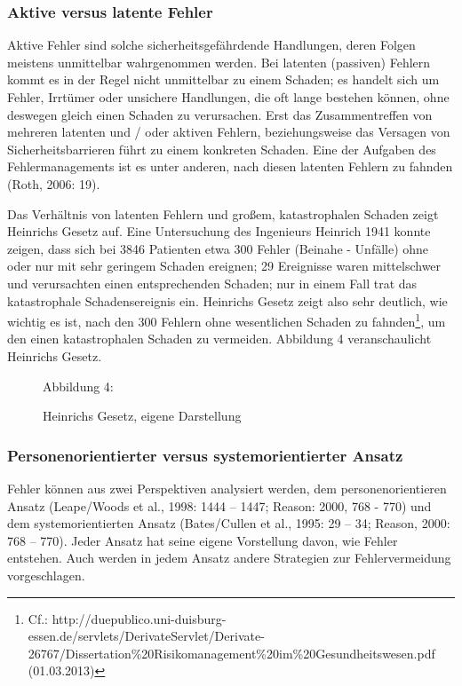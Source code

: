 \subsubsection{Aktive versus latente Fehler}

Aktive Fehler sind solche sicherheitsgefährdende Handlungen,
deren Folgen meistens unmittelbar wahrgenommen werden. Bei
latenten (passiven) Fehlern kommt es in der Regel nicht
unmittelbar zu einem Schaden; es handelt sich um Fehler,
Irrtümer oder unsichere Handlungen, die oft lange bestehen
können, ohne deswegen gleich einen Schaden zu verursachen.
Erst das Zusammentreffen von mehreren latenten und / oder
aktiven Fehlern, beziehungsweise das Versagen von
Sicherheitsbarrieren führt zu einem konkreten Schaden. Eine
der Aufgaben des Fehlermanagements ist es unter anderen,
nach diesen latenten Fehlern zu fahnden (Roth, 2006: 19).




Das Verhältnis von latenten Fehlern und großem,
katastrophalen Schaden zeigt Heinrichs Gesetz auf. Eine
Untersuchung des Ingenieurs Heinrich 1941 konnte zeigen,
dass sich bei 3846 Patienten etwa 300 Fehler (Beinahe -
Unfälle) ohne oder nur mit sehr geringem Schaden ereignen;
29 Ereignisse waren mittelschwer und verursachten einen
entsprechenden Schaden; nur in einem Fall trat das
katastrophale Schadensereignis ein. Heinrichs Gesetz zeigt
also sehr deutlich, wie wichtig es ist, nach den 300
Fehlern ohne wesentlichen Schaden zu fahnden\footnote{ Cf.:
http://duepublico.uni-duisburg-essen.de/servlets/DerivateServlet/Derivate-26767/Dissertation\%20Risikomanagement\%20im\%20Gesundheitswesen.pdf
(01.03.2013)}, um den einen katastrophalen Schaden zu
vermeiden. Abbildung 4 veranschaulicht Heinrichs Gesetz.


\begin{figure}
Abbildung 4: 
\caption{Heinrichs Gesetz, eigene Darstellung}
\end{figure}








\subsubsection{Personenorientierter versus systemorientierter
Ansatz}

Fehler können aus zwei Perspektiven
analysiert werden, dem personenorientieren Ansatz
(Leape/Woods et al., 1998: 1444 – 1447; Reason: 2000, 768 -
770) und dem systemorientierten Ansatz (Bates/Cullen et
al., 1995: 29 – 34; Reason, 2000: 768 – 770). Jeder Ansatz
hat seine eigene Vorstellung davon, wie Fehler entstehen.
Auch werden in jedem Ansatz andere Strategien zur
Fehlervermeidung vorgeschlagen.

